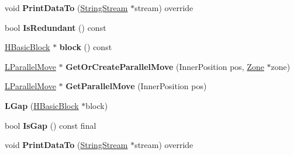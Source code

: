 \begin{DoxyCompactItemize}
\item 
void {\bfseries Print\+Data\+To} (\hyperlink{classv8_1_1internal_1_1_string_stream}{String\+Stream} $\ast$stream) override\hypertarget{classv8_1_1internal_1_1_l_gap_ad22b85643ee0ccf9a50f8cc0e73abc19}{}\label{classv8_1_1internal_1_1_l_gap_ad22b85643ee0ccf9a50f8cc0e73abc19}

\item 
bool {\bfseries Is\+Redundant} () const \hypertarget{classv8_1_1internal_1_1_l_gap_afd74524d060224489b5e7095e3354e1e}{}\label{classv8_1_1internal_1_1_l_gap_afd74524d060224489b5e7095e3354e1e}

\item 
\hyperlink{classv8_1_1internal_1_1_h_basic_block}{H\+Basic\+Block} $\ast$ {\bfseries block} () const \hypertarget{classv8_1_1internal_1_1_l_gap_a14ee6777d69e95f0c17ce3dcc0c6431e}{}\label{classv8_1_1internal_1_1_l_gap_a14ee6777d69e95f0c17ce3dcc0c6431e}

\item 
\hyperlink{classv8_1_1internal_1_1_l_parallel_move}{L\+Parallel\+Move} $\ast$ {\bfseries Get\+Or\+Create\+Parallel\+Move} (Inner\+Position pos, \hyperlink{classv8_1_1internal_1_1_zone}{Zone} $\ast$zone)\hypertarget{classv8_1_1internal_1_1_l_gap_afa07f91a1bdbab70770e57c45a4c93cd}{}\label{classv8_1_1internal_1_1_l_gap_afa07f91a1bdbab70770e57c45a4c93cd}

\item 
\hyperlink{classv8_1_1internal_1_1_l_parallel_move}{L\+Parallel\+Move} $\ast$ {\bfseries Get\+Parallel\+Move} (Inner\+Position pos)\hypertarget{classv8_1_1internal_1_1_l_gap_a80a7bd7cd4beef3be42928544646c5fb}{}\label{classv8_1_1internal_1_1_l_gap_a80a7bd7cd4beef3be42928544646c5fb}

\item 
{\bfseries L\+Gap} (\hyperlink{classv8_1_1internal_1_1_h_basic_block}{H\+Basic\+Block} $\ast$block)\hypertarget{classv8_1_1internal_1_1_l_gap_a065fcd3080fabb91cccfc541f7cf90f0}{}\label{classv8_1_1internal_1_1_l_gap_a065fcd3080fabb91cccfc541f7cf90f0}

\item 
bool {\bfseries Is\+Gap} () const  final\hypertarget{classv8_1_1internal_1_1_l_gap_ae74844feaf20986b3e1f0c6e6da350f8}{}\label{classv8_1_1internal_1_1_l_gap_ae74844feaf20986b3e1f0c6e6da350f8}

\item 
void {\bfseries Print\+Data\+To} (\hyperlink{classv8_1_1internal_1_1_string_stream}{String\+Stream} $\ast$stream) override\hypertarget{classv8_1_1internal_1_1_l_gap_ad22b85643ee0ccf9a50f8cc0e73abc19}{}\label{classv8_1_1internal_1_1_l_gap_ad22b85643ee0ccf9a50f8cc0e73abc19}


\end{DoxyCompactItemize}
